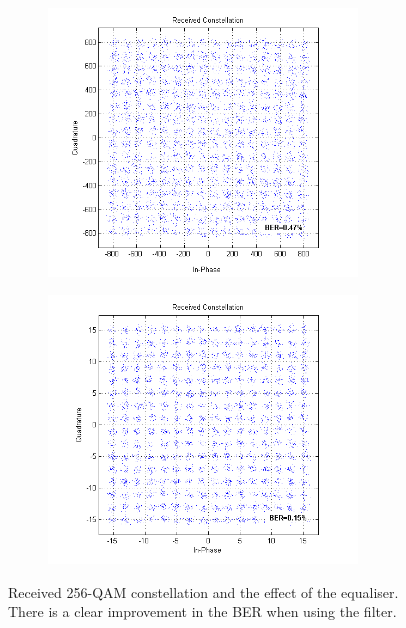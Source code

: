 \documentclass[12pt,a4paper,openright]{report}
\begin{document}
 \begin{figure}[H]
 \centering
 \begin{subfigure}{.45\textwidth}
   \centering
   \includegraphics[width=0.9\textwidth]{rcvdNOEQ.png}
   \label{fig:ConstBeforeFilt}
    \end{subfigure}%
 \begin{subfigure}{.45\textwidth}
   \includegraphics[width=0.9\textwidth]{rcvdEQ.png}
     \label{fig:ConstAfterFilt}
    \end{subfigure}
 \caption[Received 256-QAM constellation and the effect of the equaliser]{Received 256-QAM constellation and the effect of the equaliser. There is a clear improvement in the BER when using the filter.}
    \label{fig:RcvdQAMsignal}
 \end{figure} 
\end{document}

